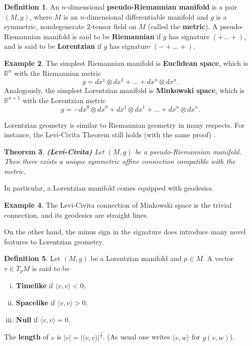 \documentclass[12pt]{amsart}
\newcommand{\bbR}{\mathbb{R}}      %
\newtheorem{Thm}{Theorem}[section]
\theoremstyle{definition}
\newtheorem{Def}[Thm]{Definition}
\newtheorem{Example}[Thm]{Example}
\theoremstyle{remark}
\begin{document}
\begin{Def}
An $n$-dimensional {\bf pseudo-Riemannian manifold} is a pair $(M,g)$, where $M$ is an $n$-dimensional differentiable manifold and $g$ is a symmetric, nondegenerate $2$-tensor field on $M$ (called the {\bf metric}). A pseudo-Riemannian manifold is said to be {\bf Riemannian} if $g$ has signature $(+ \ldots +)$, and is said to be {\bf Lorentzian} if $g$ has signature $(-+ \ldots +)$.
\end{Def}

\begin{Example}
The simplest Riemannian manifold is {\bf Euclidean space}, which is $\bbR^n$ with the Riemannian metric
\[
g = dx^1 \otimes dx^1 + \ldots + dx^n \otimes dx^n.
\]
Analogously, the simplest Lorentzian manifold is {\bf Minkowski space}, which is $\bbR^{n+1}$ with the Lorentzian metric
\[
g = -dx^0 \otimes dx^0 + dx^1 \otimes dx^1 + \ldots + dx^n \otimes dx^n.
\]
\end{Example}

Lorentzian geometry is similar to Riemannian geometry in many respects. For instance, the Levi-Civita Theorem still holds (with the same proof) .

\begin{Thm}
{\bf (Levi-Civita)} Let $(M,g)$ be a pseudo-Riemannian manifold. Then there exists a unique symmetric affine connection compatible with the metric.
\end{Thm}

In particular, a Lorentzian manifold comes equipped with geodesics.

\begin{Example}
The Levi-Civita connection of Minkowski space is the trivial connection, and its geodesics are straight lines.
\end{Example}

On the other hand, the minus sign in the signature does introduce many novel features to Lorentzian geometry.

\begin{Def}
Let $(M,g)$ be a Lorentzian manifold and $p \in M$. A vector $v \in T_pM$ is said to be
\begin{enumerate}[(i)]
\item
{\bf Timelike} if $\langle v, v \rangle < 0$;
\item
{\bf Spacelike} if $\langle v, v \rangle > 0$;
\item
{\bf Null} if $\langle v, v \rangle = 0$.
\end{enumerate}
The {\bf length} of $v$ is $|v|=|\langle v, v \rangle|^\frac12$. (As usual one writes $\langle v, w \rangle$ for $g(v,w)$).
\end{Def}
\end{document}

